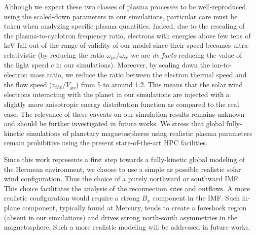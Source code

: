 \documentclass{aa}
\begin{document}
Although we expect these two classes of plasma processes to be well-reproduced using the scaled-down parameters in our simulations, particular care must be taken when analyzing specific plasma quantities. Indeed, due to the rescaling of the plasma-to-cyclotron frequency ratio, electrons with energies above few tens of keV fall out of the range of validity of our model since their speed becomes ultra-relativistic (by reducing the ratio $\omega_{pe}/\omega_{ce}$ we are \textit{de facto} reducing the value of the light speed $c$ in our simulations). Moreover, by scaling down the ion-to-electron mass ratio, we reduce the ratio between the electron thermal speed and the flow speed ($v_{the}/V_{_{SW}}$) from 5 to around 1.2. This means that the solar wind electrons interacting with the planet in our simulations are injected with a slightly more anisotropic energy distribution function as compared to the real case. The relevance of these caveats on our simulation results remains unknown and should be further investigated in future works. 
We stress that global fully-kinetic simulations of planetary magnetospheres using realistic plasma parameters remain prohibitive using the present state-of-the-art HPC facilities. 

Since this work represents a first step towards a fully-kinetic global modeling of the Hermean environment, we choose to use a simple as possible realistic solar wind configuration. Thus the choice of a purely northward or southward IMF. This choice facilitates the analysis of the reconnection sites and outflows. A more realistic configuration would require a strong $B_x$ component in the IMF. Such in-plane component, typically found at Mercury, tends to create a foreshock region (absent in our simulations) and drives strong north-south asymmetries in the magnetosphere. Such a more realistic modeling will be addressed in future works.
\end{document}
